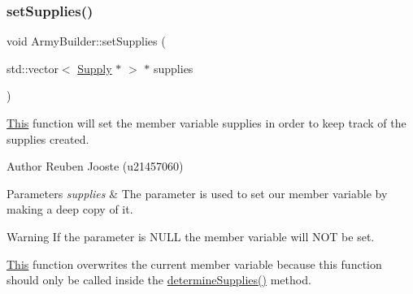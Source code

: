 \subsubsection{\texorpdfstring{setSupplies()}{setSupplies()}}
{\footnotesize\ttfamily void Army\+Builder\+::set\+Supplies (\begin{DoxyParamCaption}\item[{std\+::vector$<$ \mbox{\hyperlink{class_supply}{Supply}} $\ast$ $>$ $\ast$}]{supplies }\end{DoxyParamCaption})}



\mbox{\hyperlink{class_this}{This}} function will set the member variable supplies in order to keep track of the supplies created. 

\begin{DoxyAuthor}{Author}
Reuben Jooste (u21457060) 
\end{DoxyAuthor}

\begin{DoxyParams}{Parameters}
{\em supplies} & The parameter is used to set our member variable by making a deep copy of it. \\
\hline
\end{DoxyParams}
\begin{DoxyWarning}{Warning}
If the parameter is N\+U\+LL the member variable will N\+OT be set. 

\mbox{\hyperlink{class_this}{This}} function overwrites the current member variable because this function should only be called inside the \mbox{\hyperlink{class_army_builder_ae999bf5bc4c83243f2d000e6f981c986}{determine\+Supplies()}} method. 
\end{DoxyWarning}
